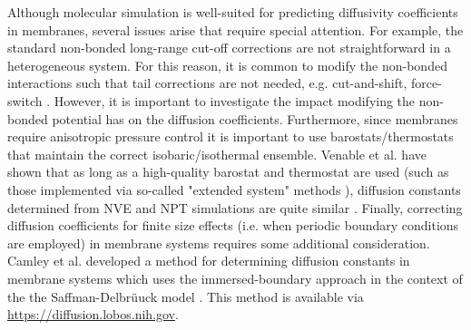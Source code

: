 \documentclass[9pt,bestpractices]{livecoms}
\begin{document}
Although molecular simulation is well-suited for predicting diffusivity coefficients in membranes, several issues arise that require special attention. For example, the standard non-bonded long-range cut-off corrections are not straightforward in a heterogeneous system. For this reason, it is common to modify the non-bonded interactions such that tail corrections are not needed, e.g. cut-and-shift, force-switch \cite{GROMACS,Brooks2009}. However, it is important to investigate the impact modifying the non-bonded potential has on the diffusion coefficients. Furthermore, since membranes require anisotropic pressure control it is important to use barostats/thermostats that maintain the correct isobaric/isothermal ensemble. Venable et al. have shown that as long as a high-quality barostat and thermostat are used (such as those implemented via so-called "extended system" methods \cite{Nose1984,Hoover1985}), diffusion constants determined from NVE and NPT simulations are quite similar \cite{Venable2017}. Finally, correcting diffusion coefficients for finite size effects (i.e. when periodic boundary conditions are employed) in membrane systems requires some additional consideration. Camley et al. developed a method for determining diffusion constants in membrane systems which uses the immersed-boundary approach in the context of the the Saffman-Delbr{\"u}uck model \cite{Camley2015}. This method is available via \url{https://diffusion.lobos.nih.gov}.





\end{document}
